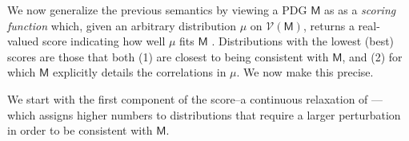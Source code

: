 \documentclass{article}
\theoremstyle{plain}
\theoremstyle{definition}
\theoremstyle{remark}
\newcommand{\V}{\mathcal V}
\newcommand{\sfM}{\mathsf M}
\numberwithin{equation}{section}
\begin{document}
	We now generalize the previous semantics by viewing a PDG $\sfM$ as
	as a \emph{scoring function} which, given an arbitrary distribution $\mu$ on $\V(\sfM)$,
	returns a real-valued score indicating how well $\mu$ fits $\sfM$%
	. Distributions with the lowest (best) scores are those that both (1)
	 are closest to being consistent with $\sfM$, 
	 and (2) for which $\sfM$ explicitly details 
	the correlations in $\mu$.
	We now make this precise.


	We start with the first component of the score--a continuous relaxation of ---which assigns higher numbers to distributions that require a larger perturbation in order to be consistent with $\sfM$. 
%
\end{document}
